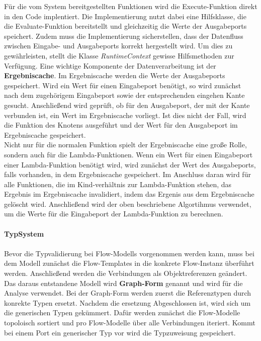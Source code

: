 \documentclass{article}
\begin{document}
    Für die vom System bereitgestellten Funktionen wird die Execute-Funktion direkt in den Code implentiert. 
    Die Implementierung nutzt dabei eine Hilfsklasse, die die Evaluate-Funktion bereitstellt und gleichzeitig die Werte der Ausgabeports speichert.
    Zudem muss die Implementierung sicherstellen, dass der Datenfluss zwischen Eingabe- und Ausgabeports korrekt hergestellt wird. 
    Um dies zu gewährleisten, stellt die Klasse \textit{RuntimeContext} gewisse Hilfsmethoden zur Verfügung.
    Eine wichtige Komponente der Datenverarbeitung ist der \textbf{Ergebniscache}. 
    Im Ergebniscache werden die Werte der Ausgabeports gespeichert.
    Wird ein Wert für einen Eingabeport benötigt, so wird zunächst nach dem zugehörigem Eingabeport sowie der entsprechenden eingehen Kante gesucht. 
    Anschließend wird geprüft, ob für den Ausgabeport, der mit der Kante verbunden ist, ein Wert im Ergebniscache vorliegt.
    Ist dies nicht der Fall, wird die Funktion des Knotens ausgeführt und der Wert für den Ausgabeport im Ergebniscache gespeichert.\\
    Nicht nur für die normalen Funktion spielt der Ergebniscache eine große Rolle, sondern auch für die Lambda-Funktionen.
    Wenn ein Wert für einen Eingabeport einer Lambda-Funktion benötigt wird, wird zunächst der Wert des Ausgabeports, falls vorhanden, in dem Ergebniscache gespeichert.
    Im Anschluss daran wird für alle Funktionen, die im Kind-verhältnis zur Lambda-Funktion stehen, das Ergebnis im Ergebniscache invalidiert, indem das Ergenis aus dem Ergebniscache gelöscht wird.
    Anschließend wird der oben beschriebene Algortihmus verwendet, um die Werte für die Eingabeport der Lambda-Funktion zu berechnen.\\
    \\
    \textbf{TypSystem}\\
    \\
    Bevor die Typvalidierung bei Flow-Modells vorgenommen werden kann, muss bei dem Modell zunächst die Flow-Templates in die konkrete Flow-Instanz überführt werden. 
    Anschließend werden die Verbindungen als Objektreferenzen geändert. 
    Das daraus entstandene Modell wird \textbf{Graph-Form} genannt und wird für die Analyse verwendet.
    Bei der Graph-Form werden zuerst die Referenztypen durch konrekte Typen ersetzt. 
    Nachdem die ersetzung Abgeschlossen ist, wird sich um die generischen Typen gekümmert. 
    Dafür werden zunächst die Flow-Modelle topoloisch sortiert und pro Flow-Modelle über alle Verbindungen iteriert. 
    Kommt bei einem Port ein generischer Typ vor wird die Typzuweisung gespeichert. 
\end{document}
